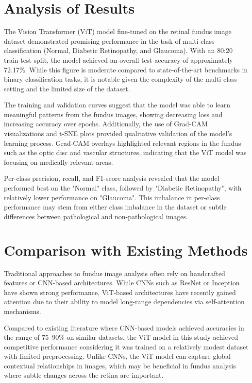 \documentclass[a4paper,12pt]{report}
\begin{document}
\section{Analysis of Results}

The Vision Transformer (ViT) model fine-tuned on the retinal fundus image dataset demonstrated promising performance in the task of multi-class classification (Normal, Diabetic Retinopathy, and Glaucoma). With an 80:20 train-test split, the model achieved an overall test accuracy of approximately 72.17\%. While this figure is moderate compared to state-of-the-art benchmarks in binary classification tasks, it is notable given the complexity of the multi-class setting and the limited size of the dataset.

The training and validation curves suggest that the model was able to learn meaningful patterns from the fundus images, showing decreasing loss and increasing accuracy over epochs. Additionally, the use of Grad-CAM visualizations and t-SNE plots provided qualitative validation of the model's learning process. Grad-CAM overlays highlighted relevant regions in the fundus such as the optic disc and vascular structures, indicating that the ViT model was focusing on medically relevant areas.

Per-class precision, recall, and F1-score analysis revealed that the model performed best on the "Normal" class, followed by "Diabetic Retinopathy", with relatively lower performance on "Glaucoma". This imbalance in per-class performance may stem from either class imbalance in the dataset or subtle differences between pathological and non-pathological images.

\section{Comparison with Existing Methods}

Traditional approaches to fundus image analysis often rely on handcrafted features or CNN-based architectures. While CNNs such as ResNet or Inception have shown strong performance, ViT-based architectures have recently gained attention due to their ability to model long-range dependencies via self-attention mechanisms.

Compared to existing literature where CNN-based models achieved accuracies in the range of 75–90\% on similar datasets, the ViT model in this study achieved competitive performance considering it was trained on a relatively modest dataset with limited preprocessing. Unlike CNNs, the ViT model can capture global contextual relationships in images, which may be beneficial in fundus analysis where subtle changes across the retina are important.
\end{document}
